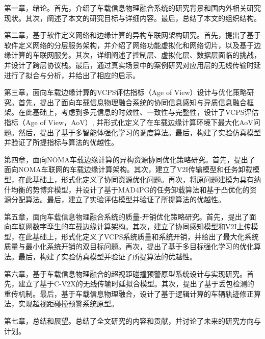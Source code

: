 第一章，绪论。首先，介绍了车载信息物理融合系统的研究背景和国内外相关研究现状。其次，阐述了本文的研究目标与详细内容。最后，总结了本文的组织结构。

第二章，基于软件定义网络和边缘计算的异构车联网架构研究。首先，提出了基于软件定义网络的分层服务架构，并介绍了网络功能虚拟化和网络切片，以及基于边缘计算的车联网服务。其次，详细阐述了控制层、虚拟化层、数据层面临的挑战，并设计了跨层协议栈。最后，通过真实场景中的案例研究对应用层的无线传输时延进行了拟合与分析，并给出了相应的启示。

第三章，面向车载边缘计算的VCPS评估指标（Age of View）设计与优化策略研究。首先，提出了面向车载信息物理融合系统的协同信息感知与异质信息融合框架。在此基础上，考虑到多元信息的时效性、一致性与完整性，设计了VCPS评估指标（Age of View，AoV）, 并形式化定义了在车载边缘计算环境下最大化AoV问题。然后，提出了基于多智能体强化学习的调度算法。最后，构建了实验仿真模型并验证了所提指标与算法的优越性。

第四章，面向NOMA车载边缘计算的异构资源协同优化策略研究。首先，提出了面向NOMA车联网的车载边缘计算架构。其次，建立了V2I传输模型和任务卸载模型，在此基础上，形式化定义了协同资源优化问题。再次，将原问题建模为具有纳什均衡的势博弈模型，并设计了基于MAD4PG的任务卸载算法和基于凸优化的资源分配算法。最后，建立了实验评估模型并验证了所提算法的优越性。

第五章，面向车载信息物理融合系统的质量-开销优化策略研究。首先，提出了面向车联网数字孪生的车载边缘计算架构。其次，建立了协同感知模型和V2I上传模型，在此基础上，形式化定义了VCPS系统质量和系统开销，并给出了最大化系统质量与最小化系统开销的双目标问题。再次，提出了基于多目标强化学习的优化算法。最后，构建了实验仿真模型并验证了所提算法的优越性。

第六章，基于车载信息物理融合的超视距碰撞预警原型系统设计与实现研究。首先，建立了基于C-V2X的无线传输时延拟合模型。其次，提出了基于丢包检测的重传机制。最后，基于车载信息物理融合，设计了基于逻辑计算的车辆轨迹修正算法，实现超视距碰撞预警系统原型。

第七章，总结和展望。总结了全文研究的内容和贡献，并讨论了未来的研究方向与计划。






